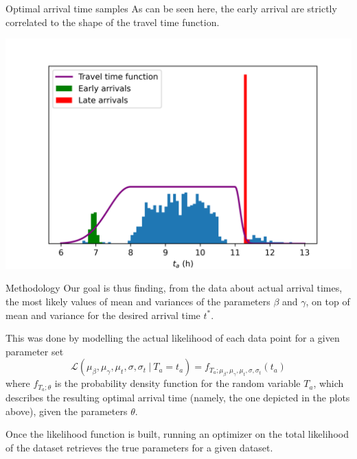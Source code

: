 \documentclass{beamer}
\begin{document}
\begin{frame}{Optimal arrival time samples}
  As can be seen here, the early arrival are strictly correlated to the shape of the travel time function.
  \begin{center}
    \includegraphics[width=\textwidth]{t_as_bins_tt}
  \end{center}
\end{frame}

\begin{frame}{Methodology}
  Our goal is thus finding, from the data about actual arrival times, the most likely values of mean and variances of the parameters \(\beta\) and \(\gamma\), on top of mean and variance for the desired arrival time \(t^*\).

  This was done by modelling the actual likelihood of each data point for a given parameter set
  \begin{equation*}
    \mathcal{L}(\mu_\beta, \mu_\gamma, \mu_t, \sigma, \sigma_t\ \vert\ T_a = t_a) =
  f_{T_a; \mu_\beta, \mu_\gamma, \mu_t, \sigma, \sigma_t}(t_a)
  \end{equation*}
  where \(f_{T_a; \theta}\) is the probability density function for the random variable \(T_a\),
  which describes the resulting optimal arrival time (namely, the one depicted in the plots above), given the parameters \(\theta\).
  
  Once the likelihood function is built, running an optimizer on the total likelihood of the dataset retrieves the true parameters for a given dataset.
\end{frame}
\end{document}
